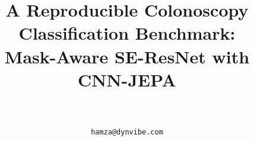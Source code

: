 

\title{A Reproducible Colonoscopy Classification Benchmark:\\Mask-Aware SE-ResNet with CNN-JEPA}

\author{\authorname\\
\small \affil\\
\small \texttt{hamza@dynvibe.com}}

\date{}


\maketitle













